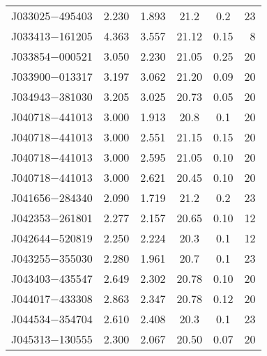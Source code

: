 \begin{table}
\begin{center}
{\begin{tabular}{lccccr}
 J033025$-$495403 &      2.230 &                    1.893 &                    21.2 &                0.2 &                23 \\
 J033413$-$161205 &      4.363 &                    3.557 &                   21.12 &               0.15 &                 8 \\
 J033854$-$000521 &      3.050 &                    2.230 &                   21.05 &               0.25 &                20 \\
 J033900$-$013317 &      3.197 &                    3.062 &                   21.20 &               0.09 &                20 \\
 J034943$-$381030 &      3.205 &                    3.025 &                   20.73 &               0.05 &                20 \\
 J040718$-$441013 &      3.000 &                    1.913 &                   20.8  &               0.1  &                20 \\
 J040718$-$441013 &      3.000 &                    2.551 &                   21.15 &               0.15 &                20 \\
 J040718$-$441013 &      3.000 &                    2.595 &                   21.05 &               0.10 &                20 \\
 J040718$-$441013 &      3.000 &                    2.621 &                   20.45 &               0.10 &                20 \\
 J041656$-$284340 &      2.090 &                    1.719 &                    21.2 &                0.2 &                23 \\
 J042353$-$261801 &      2.277 &                    2.157 &                   20.65 &               0.10 &                12 \\
 J042644$-$520819 &      2.250 &                    2.224 &                    20.3 &                0.1 &                12 \\
 J043255$-$355030 &      2.280 &                    1.961 &                    20.7 &                0.1 &                23 \\
 J043403$-$435547 &      2.649 &                    2.302 &                   20.78 &               0.10 &                20 \\
 J044017$-$433308 &      2.863 &                    2.347 &                   20.78 &               0.12 &                20 \\
 J044534$-$354704 &      2.610 &                    2.408 &                    20.3 &                0.1 &                23 \\
 J045313$-$130555 &      2.300 &                    2.067 &                   20.50 &               0.07 &                20 \\
\end{tabular}
}
\end{center}
\end{table}

